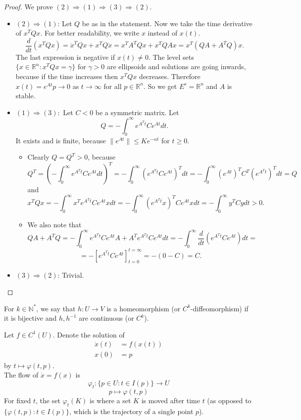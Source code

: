 \documentclass{article}
\newcommand*{\N}{\mathbb{N}}
\newcommand*{\R}{\mathbb{R}}
\newcommand*{\Ns}{\N^*}
\begin{document}
\begin{proof}
    We prove $(2) \Rightarrow (1) \Rightarrow (3) \Rightarrow (2)$.
    \begin{itemize}
        \item $(2) \Rightarrow (1)$: Let $Q$ be as in the statement. Now we take the time derivative of $x^TQx$. For better readability, we write $x$ instead of $x(t)$.
        $$\frac{d}{dt}(x^TQx) = \dot x^TQx+x^TQ\dot x = x^TA^TQx+x^TQAx = x^T(QA+A^TQ)x.$$
        The last expression is negative if $x(t) \neq 0$. The level sets $\{x \in \R^n: x^TQx = \gamma\}$ for $\gamma > 0$ are ellipsoids and solutions are going inwards, because if the time increases then $x^TQx$ decreases. Therefore $x(t) = e^{At}p\to 0$ as $t\to\infty$ for all $p \in \R^n$. So we get $E^s = \R^n$ and $A$ is stable.

        \item $(1)\Rightarrow (3):$ Let $C < 0$ be a symmetric matrix. Let
        $$Q = -\int_0^\infty e^{A^Tt}Ce^{At}dt.$$ It exists and is finite, because $\|e^{At}\|\leq Ke^{-\alpha t}$ for $t\geq 0$.
        \begin{itemize}
            \item Clearly $Q=Q^T>0$, because
            $$Q^T = \left(-\int_0^\infty e^{A^Tt}Ce^{At}dt\right)^T = -\int_0^\infty\left(e^{A^Tt}Ce^{At}\right)^Tdt= -\int_0^\infty\left(e^{At}\right)^TC^T\left(e^{A^Tt}\right)^Tdt = Q$$
            and
            $$x^TQx = -\int_0^\infty x^Te^{A^Tt}Ce^{At}xdt = -\int_0^\infty \left(e^{A^Tt}x\right)^TCe^{At}xdt = -\int_0^\infty y^TCydt > 0.$$

            \item We also note that
            $$QA+A^TQ = -\int_0^\infty e^{A^Tt}Ce^{At}A+A^Te^{A^Tt}Ce^{At}dt = -\int_0^\infty \frac{d}{dt}(e^{A^Tt}Ce^{At})dt =$$
            $$=-[e^{A^Tt}Ce^{At}]_{t=0}^{t=\infty} = -(0-C)=C.$$
        \end{itemize}

        \item $(3)\Rightarrow (2)$: Trivial.
    \end{itemize}
\end{proof}

\begin{defin}
    For $k \in\Ns$, we say that $h:U\to V$ is a homeomorphism (or $C^k$-diffeomorphism) if it is bijective and $h,h^{-1}$ are continuous (or $C^k$).\\
\end{defin}

\begin{defin}[Flow]
    Let  $f \in C^1(U)$. Denote the solution of
    $$\begin{aligned}\dot x(t) &= f(x(t))\\
    x(0) &= p\end{aligned}$$
    by $t \mapsto \varphi(t,p)$.\\
    The flow of $\dot x=f(x)$ is
    $$\varphi_t:\{p\in U: t\in I(p)\} \to U$$
    $$p \mapsto \varphi(t,p)$$
    For fixed $t$, the set $\varphi_t(K)$ is where a set $K$ is moved after time $t$ (as opposed to $\{\varphi(t,p)\colon t \in I(p)\}$, which is the trajectory of a single point $p$).
\end{defin}
\end{document}
